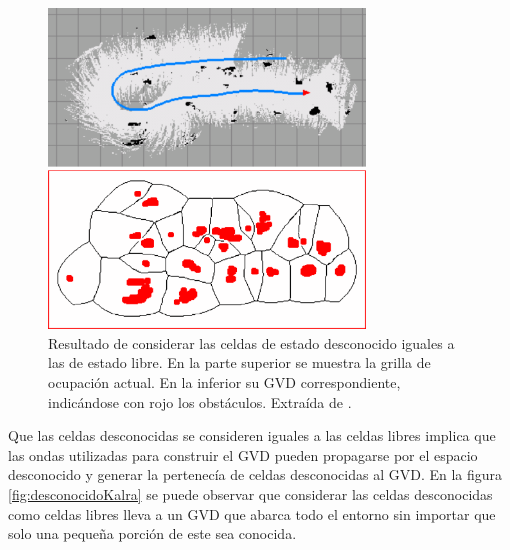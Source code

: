 \begin{figure}[H]
  \centerfloat

  \includegraphics[clip=true, width=0.75\textwidth]{imagenes/desconocidoCons/kalraOG.png}

  \caption[Resultado de considerar las celdas de estado desconocido iguales a las de estado libre.]{Resultado de considerar las celdas de estado desconocido iguales a las de estado libre. En la parte superior se muestra la grilla de ocupación actual. En la inferior su GVD correspondiente, indicándose con rojo los obstáculos. Extraída de \cite{kalra2009incremental}.}\label{fig:kalraOG}

\end{figure}

Que las celdas desconocidas se consideren iguales a las celdas libres
implica que las ondas utilizadas para construir el GVD pueden propagarse por el
espacio desconocido y generar la pertenecía de celdas desconocidas al GVD.
En la figura \ref{fig:desconocidoKalra} se puede observar que considerar las
celdas desconocidas como celdas libres lleva a un GVD que abarca
todo el entorno sin importar que solo una pequeña porción de este sea
conocida. 


